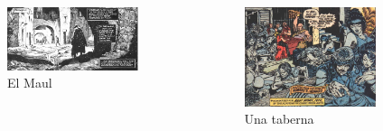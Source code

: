 \begin{frame}{}
\begin{columns}
    \begin{figure}[htb]
    \centering
        \includegraphics[width=0.9\textwidth]{img/res/01}
        \caption{El Maul}
    \end{figure}
    \begin{figure}[htb]
    \centering
        \includegraphics[width=0.9\textwidth]{img/res/02}
        \caption{Una taberna}
    \end{figure}
\end{columns}
\end{frame}


